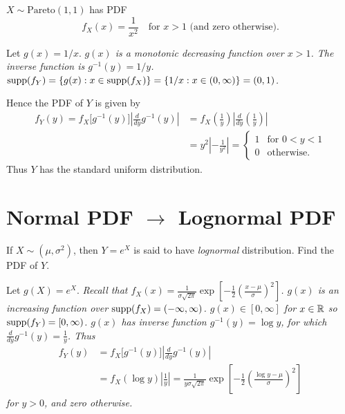 \begin{solution}
$X\sim\text{Pareto}(1,1)$ has PDF 
\[
f_X(x) = \displaystyle\frac{1}{x^2} \quad\text{for $x>1$ (and zero otherwise)}.
\]

Let $g(x) = 1/x$. 
\bit
\it $g(x)$ is a monotonic decreasing function over $x>1$. 
\it The inverse function is $g^{-1}(y) = 1/y$.
\it $\text{supp}(f_Y) = \{g(x): x\in\text{supp}(f_X)\} = \{1/x :x\in(0,\infty)\} = (0,1)$.
\eit
%
%

Hence the PDF of $Y$ is given by
\begin{align*}
f_Y(y)
	  = f_X\big[g^{-1}(y)\big]\left|\frac{d}{dy}g^{-1}(y)\right| 
	& = f_X\left(\frac{1}{y}\right)\left|\frac{d}{dy}\left(\frac{1}{y}\right)\right| \\
	& = y^2 \left|-\frac{1}{y^2}\right| 
	= \begin{cases}
		1	& \text{for } 0<y<1 \\
		0	& \text{otherwise.}
	\end{cases}
\end{align*}
Thus $Y$ has the standard uniform distribution.
\end{solution}


\section{Normal PDF $\longrightarrow$ Lognormal PDF}


\begin{example}
If $X\sim(\mu,\sigma^2)$, then $Y=e^X$ is said to have \emph{lognormal} distribution. Find the PDF of $Y$.
\end{example}
\begin{solution}
Let $g(X) = e^X$. 
\bit
\it Recall that $f_X(x) = \displaystyle\frac{1}{\sigma\sqrt{2\pi}}\exp\left[-\frac{1}{2}\left(\frac{x-\mu}{\sigma}\right)^2\right]$.
\it $g(x)$ is an increasing function over $\text{supp}(f_X) = (-\infty,\infty)$.
\it $g(x)\in[0,\infty]$ for $x\in\mathbb{R}$ so $\text{supp}(f_Y) = [0,\infty)$.
\it $g(x)$ has inverse function $g^{-1}(y) = \log y$, for which $\displaystyle \frac{d}{dy}g^{-1}(y) = \frac{1}{y}$.
\eit
Thus
\begin{align*}
f_Y(y)
	& = f_X\big[g^{-1}(y)\big]\left|\frac{d}{dy}g^{-1}(y)\right| \\
	& = f_X(\log y)\left|\frac{1}{y}\right| 
	=  \frac{1}{y\sigma\sqrt{2\pi}}\exp\left[-\frac{1}{2}\left(\frac{\log y-\mu}{\sigma}\right)^2\right]
\end{align*}
for $y>0$, and zero otherwise.
\end{solution}


